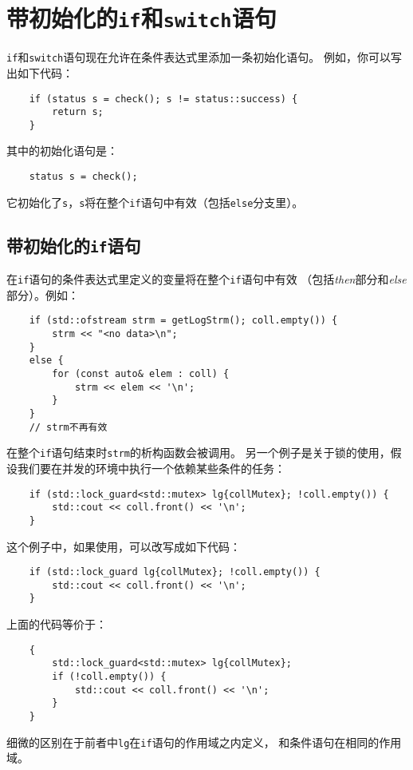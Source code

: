 \section{带初始化的\texttt{if}和\texttt{switch}语句}\label{ch2}
\texttt{if}和\texttt{switch}语句现在允许在条件表达式里添加一条初始化语句。
例如，你可以写出如下代码：
\begin{lstlisting}
    if (status s = check(); s != status::success) {
        return s;
    }
\end{lstlisting}
其中的初始化语句是：
\begin{lstlisting}
    status s = check();
\end{lstlisting}
它初始化了\texttt{s}，\texttt{s}将在整个\texttt{if}语句中有效（包括\texttt{else}分支里）。

\subsection{带初始化的\texttt{if}语句}\label{ch2.1}
在\texttt{if}语句的条件表达式里定义的变量将在整个\texttt{if}语句中有效
（包括\emph{then}部分和\emph{else}部分）。例如：
\begin{lstlisting}
    if (std::ofstream strm = getLogStrm(); coll.empty()) {
        strm << "<no data>\n";
    }
    else {
        for (const auto& elem : coll) {
            strm << elem << '\n';
        }
    }
    // strm不再有效
\end{lstlisting}
在整个\texttt{if}语句结束时\texttt{strm}的析构函数会被调用。
另一个例子是关于锁的使用，假设我们要在并发的环境中执行一个依赖某些条件的任务：
\begin{lstlisting}
    if (std::lock_guard<std::mutex> lg{collMutex}; !coll.empty()) {
        std::cout << coll.front() << '\n';
    }
\end{lstlisting}
这个例子中，如果使用，可以改写成如下代码：
\begin{lstlisting}
    if (std::lock_guard lg{collMutex}; !coll.empty()) {
        std::cout << coll.front() << '\n';
    }
\end{lstlisting}
上面的代码等价于：
\begin{lstlisting}
    {
        std::lock_guard<std::mutex> lg{collMutex};
        if (!coll.empty()) {
            std::cout << coll.front() << '\n';
        }
    }
\end{lstlisting}
细微的区别在于前者中\texttt{lg}在\texttt{if}语句的作用域之内定义，
和条件语句在相同的作用域。

